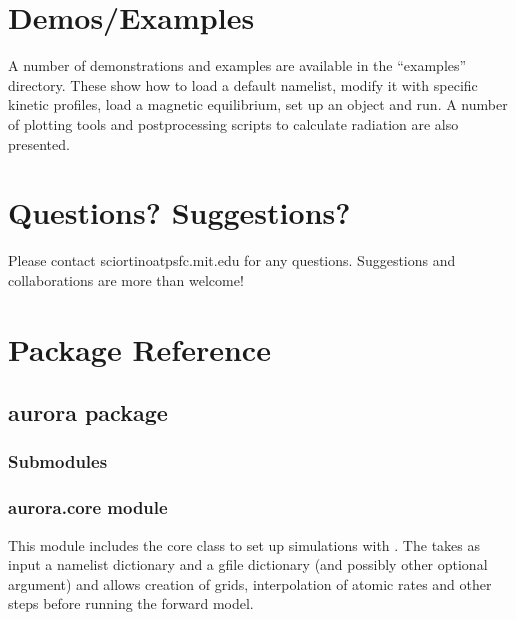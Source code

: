 \documentclass[letterpaper,10pt,english]{sphinxmanual}
\begin{document}
\chapter{Demos/Examples}
\label{\detokenize{index:demos-examples}}
A number of demonstrations and examples are available in the {\hyperref[\detokenize{aurora:module-aurora}]{}} “examples” directory. These show how to load a default namelist, modify it with specific kinetic profiles, load a magnetic equilibrium, set up an {\hyperref[\detokenize{aurora:module-aurora}]{}} object and run. A number of plotting tools and postprocessing scripts to calculate radiation are also presented.


\chapter{Questions? Suggestions?}
\label{\detokenize{index:questions-suggestions}}
Please contact sciortino\sphinxhyphen{}at\sphinxhyphen{}psfc.mit.edu for any questions. Suggestions and collaborations are more than welcome!


\chapter{Package Reference}
\label{\detokenize{index:package-reference}}

\section{aurora package}
\label{\detokenize{aurora:aurora-package}}\label{\detokenize{aurora::doc}}

\subsection{Submodules}
\label{\detokenize{aurora:submodules}}

\subsection{aurora.core module}
\label{\detokenize{aurora:module-aurora.core}}\label{\detokenize{aurora:aurora-core-module}}
This module includes the core class to set up simulations with . The {\hyperref[\detokenize{aurora:aurora.core.aurora_sim}]{}} takes as input a namelist dictionary and a g\sphinxhyphen{}file dictionary (and possibly other optional argument) and allows creation of grids, interpolation of atomic rates and other steps before running the forward model.
\end{document}
